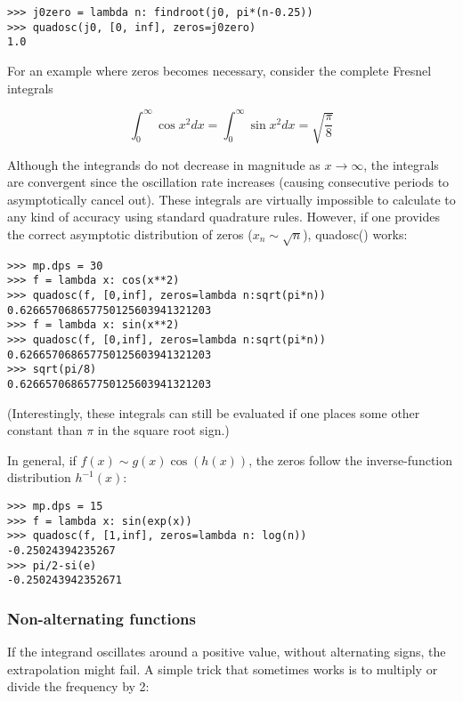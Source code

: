 \begin{lstlisting}
>>> j0zero = lambda n: findroot(j0, pi*(n-0.25))
>>> quadosc(j0, [0, inf], zeros=j0zero)
1.0
\end{lstlisting}

For an example where zeros becomes necessary, consider the complete Fresnel integrals

\begin{equation}
\int_0^{\infty} \cos x^2 dx = \int_0^{\infty} \sin x^2 dx = \sqrt{\frac{\pi}{8}}
\end{equation}

Although the integrands do not decrease in magnitude as $x \rightarrow \infty$, the integrals are convergent since the oscillation rate increases (causing consecutive periods to asymptotically cancel out). These integrals are virtually impossible to calculate to any kind of accuracy using standard quadrature rules. However, if one provides the correct asymptotic distribution of zeros ($x_n \sim \sqrt{n}$), quadosc() works:

\begin{lstlisting}
>>> mp.dps = 30
>>> f = lambda x: cos(x**2)
>>> quadosc(f, [0,inf], zeros=lambda n:sqrt(pi*n))
0.626657068657750125603941321203
>>> f = lambda x: sin(x**2)
>>> quadosc(f, [0,inf], zeros=lambda n:sqrt(pi*n))
0.626657068657750125603941321203
>>> sqrt(pi/8)
0.626657068657750125603941321203
\end{lstlisting}

(Interestingly, these integrals can still be evaluated if one places some other constant than $\pi$ in the square root sign.)

In general, if $f(x) \sim g(x) \cos(h(x))$, the zeros follow the inverse-function distribution $h^{-1}(x)$:

\begin{lstlisting}
>>> mp.dps = 15
>>> f = lambda x: sin(exp(x))
>>> quadosc(f, [1,inf], zeros=lambda n: log(n))
-0.25024394235267
>>> pi/2-si(e)
-0.250243942352671
\end{lstlisting}



\subsubsection{Non-alternating functions}

If the integrand oscillates around a positive value, without alternating signs, the extrapolation might fail. A simple trick that sometimes works is to multiply or divide the frequency by 2:

